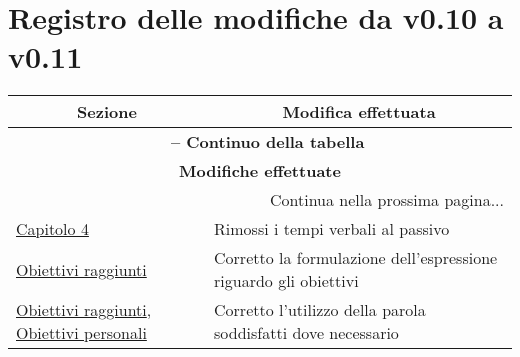 \chapter*{Registro delle modifiche da v0.10 a v0.11}
\begin{center}
\begin{longtable}{|p{}|p{}|}
\hline
\multicolumn{1}{|c|}{\textbf{Sezione}} & 
\multicolumn{1}{c|}{\textbf{Modifica effettuata}} \\ 
\hline
\endfirsthead

\multicolumn{2}{c}{{\bfseries \tablename\ \thetable{} -- Continuo della tabella}}\\
\hline
\multicolumn{2}{|c|}{\textbf{Modifiche effettuate}} \\ \hline
\endhead

\hline \multicolumn{2}{|r|}{{Continua nella prossima pagina...}} \\ \hline
\endfoot

\endlastfoot

\hyperref[cap:valutazione-retrospettiva]{Capitolo 4} & Rimossi i tempi verbali al passivo \\ \hline
\hyperref[post-obiettivi-soddisfatti]{Obiettivi raggiunti} & Corretto la formulazione dell'espressione riguardo gli obiettivi\\ \hline
\hyperref[tab:obiettivi-soddisfatti]{Obiettivi raggiunti}, \hyperref[tab:obiettivi-personali-raggiunti]{Obiettivi personali} & Corretto l'utilizzo della parola soddisfatti dove necessario\\ \hline
\end{longtable}
\end{center}
